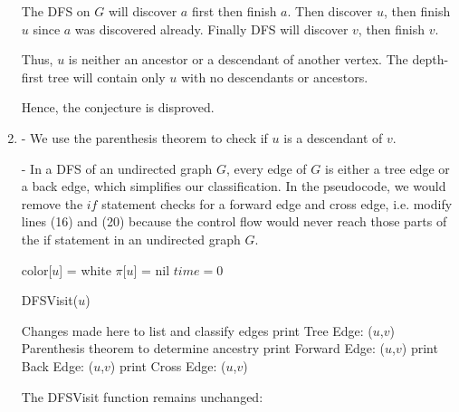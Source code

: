 \documentclass[a4paper]{report}
\begin{document}
\begin{enumerate}
      The DFS on $G$ will discover $a$ first then finish $a$. Then discover $u$, then finish $u$ since
      $a$ was discovered already. Finally DFS will discover $v$, then finish $v$.

      Thus, $u$ is neither an ancestor or a descendant of another vertex. The depth-first tree
      will contain only $u$ with no descendants or ancestors. 

      Hence, the conjecture is disproved.

    \pagebreak
    \par
    \bigskip

    \item
      - We use the parenthesis theorem to check if $u$ is a descendant of $v$. 

      - In a DFS of an undirected graph $G$, every edge of $G$ is either a tree edge or a back edge, which simplifies
      our classification. In the pseudocode, we would remove the $if$ statement checks for a forward edge and cross edge, i.e.
      modify lines (16) and (20) because the control flow would never reach those parts of the if statement in an undirected
      graph $G$.

      \begin{algorithmic}[1]
        \State color[$u$] = white
        \State $\pi$[$u$] = nil
      \EndFor
      \State $time=0$


          \State DFSVisit($u$)
        \EndIf
      \EndFor

      \Comment Changes made here to list and classify edges
          \State print Tree Edge: ($u$,$v$)
        \Else 
          \Comment Parenthesis theorem to determine ancestry
            \State print Forward Edge: ($u$,$v$)
            \State print Back Edge: ($u$,$v$)
          \Else
            \State print Cross Edge: ($u$,$v$)
          \EndIf
        \EndIf
      \EndFor

    \EndFunction
    \end{algorithmic}

    The DFSVisit function remains unchanged:


\end{enumerate}
\end{document}

